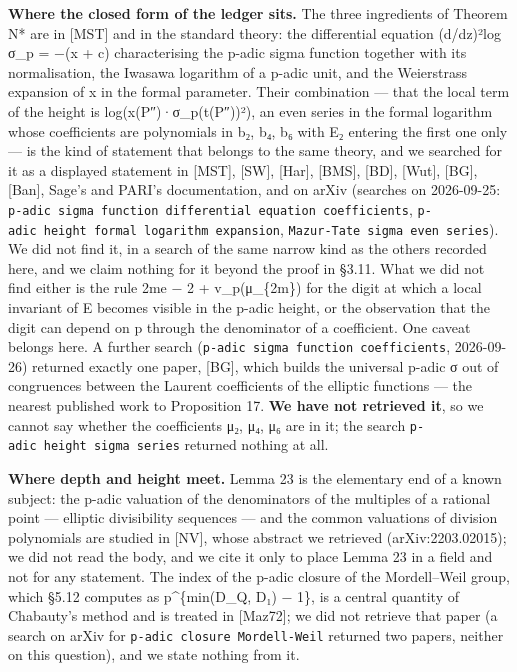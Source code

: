 \documentclass[11pt,a4paper]{article}
\theoremstyle{named}
\begin{document}
\textbf{Where the closed form of the ledger sits.} The three ingredients of Theorem N* are in [MST] and in the standard theory: the differential equation (d/dz)²log σ\_p = −(x + c) characterising the p-adic sigma function together with its normalisation, the Iwasawa logarithm of a p-adic unit, and the Weierstrass expansion of x in the formal parameter. Their combination — that the local term of the height is log(x(P″)·σ\_p(t(P″))²), an even series in the formal logarithm whose coefficients are polynomials in b₂, b₄, b₆ with E₂ entering the first one only — is the kind of statement that belongs to the same theory, and we searched for it as a displayed statement in [MST], [SW], [Har], [BMS], [BD], [Wut], [BG], [Ban], Sage's and PARI's documentation, and on arXiv (searches on 2026-09-25: \texttt{p-adic\ \allowbreak{}sigma\ \allowbreak{}function\ \allowbreak{}differential\ \allowbreak{}equation\ \allowbreak{}coefficients}, \texttt{p-adic\ \allowbreak{}height\ \allowbreak{}formal\ \allowbreak{}logarithm\ \allowbreak{}expansion}, \texttt{Mazur-Tate\ \allowbreak{}sigma\ \allowbreak{}even\ \allowbreak{}series}). We did not find it, in a search of the same narrow kind as the others recorded here, and we claim nothing for it beyond the proof in §3.11. What we did not find either is the rule 2me − 2 + v\_p(μ\_\{2m\}) for the digit at which a local invariant of E becomes visible in the p-adic height, or the observation that the digit can depend on p through the denominator of a coefficient. One caveat belongs here. A further search (\texttt{p-adic\ \allowbreak{}sigma\ \allowbreak{}function\ \allowbreak{}coefficients}, 2026-09-26) returned exactly one paper, [BG], which builds the universal p-adic σ out of congruences between the Laurent coefficients of the elliptic functions — the nearest published work to Proposition 17. \textbf{We have not retrieved it}, so we cannot say whether the coefficients μ₂, μ₄, μ₆ are in it; the search \texttt{p-adic\ \allowbreak{}height\ \allowbreak{}sigma\ \allowbreak{}series} returned nothing at all.

\textbf{Where depth and height meet.} Lemma 23 is the elementary end of a known subject: the p-adic valuation of the denominators of the multiples of a rational point — elliptic divisibility sequences — and the common valuations of division polynomials are studied in [NV], whose abstract we retrieved (arXiv:2203.02015); we did not read the body, and we cite it only to place Lemma 23 in a field and not for any statement. The index of the p-adic closure of the Mordell–Weil group, which §5.12 computes as p\textasciicircum{}\{min(D\_Q, D₁) − 1\}, is a central quantity of Chabauty's method and is treated in [Maz72]; we did not retrieve that paper (a search on arXiv for \texttt{p-adic\ \allowbreak{}closure\ \allowbreak{}Mordell-Weil} returned two papers, neither on this question), and we state nothing from it.
\end{document}

